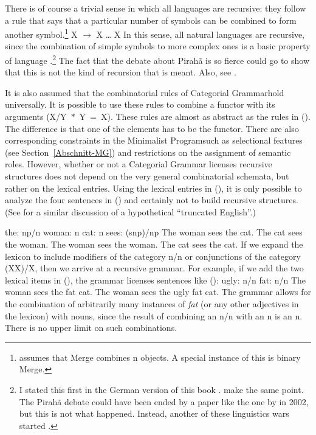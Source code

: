 There is of course a trivial sense in which all languages are recursive: they follow a rule that says that a particular number of symbols can be combined
to form another symbol.\footnote{%
  \citet[]{Chomsky2005a} assumes that Merge combines n objects. A special instance of this is binary Merge.
}
\ea
\label{ex-n-ary-merge}
X $\to$ X \ldots{} X
\z
In this sense, all natural languages are recursive, since\label{page-hockett} the combination of simple symbols to more complex ones is a basic property of language \citep[]{Hockett60a}.\footnote{
  I stated this first in the German version of this book \citep[295]{MuellerGTBuch1}. \citet*{WHRH2014a} make the same
  point. The Pirahã debate could have been ended by a paper like the one by \citeauthor{WHRH2014a}
  in 2002, but this is not what happened. Instead, another of these linguistics wars started \citep{Pullum2024a}.
} The fact that the debate about Pirah{\~a} is so fierce could go to show that this is not the kind of recursion that is meant.
Also, see \citet{Fitch2010a}.

It is also assumed that the combinatorial rules of Categorial Grammar\indexcg hold universally. It is possible to use these rules to
combine a functor with its arguments (\mbox{X/Y $*$ Y = X}). These rules are almost as abstract as the rules in (). The difference
is that one of the elements has to be the functor. There are also corresponding constraints in the Minimalist Program\indexmp such
as selectional features (see Section~\ref{Abschnitt-MG}) and restrictions on the assignment of
semantic roles. However, whether or not a Categorial Grammar licenses recursive structures does not depend on the very general combinatorial schemata, but rather on the lexical entries.
Using the lexical entries in (), it is only possible to analyze the four sentences in
() and certainly not to build recursive structures. (See  for a similar
discussion of a hypothetical ``truncated English''.)

\eal
\ex the: np/n
\ex woman: n
\ex cat: n
\ex sees: (s\bs np)/np
\zl
\eal
\ex The woman sees the cat.
\ex The cat sees the woman.
\ex The woman sees the woman.
\ex The cat sees the cat.
\zl
If we expand the lexicon to include modifiers of the category n/n or conjunctions of the category
(X\bs X)/X, then we arrive at a recursive grammar. For example, if we add the two lexical items in
(), the grammar licenses sentences like ():
\eal
\ex ugly: n/n
\ex fat: n/n
\zl
\eal
\ex The woman sees the fat cat.
\ex The woman sees the ugly fat cat.
\zl
The grammar allows for the combination of arbitrarily many instances of \emph{fat} (or any other
adjectives in the lexicon) with nouns, since the result of combining an n/n with an n is an n. There
is no upper limit on such combinations.

